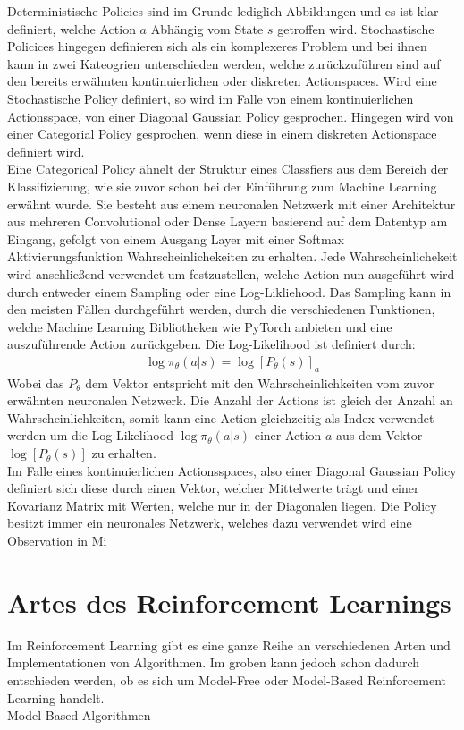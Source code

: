 \documentclass[]{iat}
\begin{document}
Deterministische Policies sind im Grunde lediglich Abbildungen und es ist klar definiert, welche Action $a$ Abhängig vom State $s$ getroffen wird. Stochastische Policices hingegen definieren sich als ein komplexeres Problem und bei ihnen kann in zwei Kateogrien unterschieden werden, welche zurückzuführen sind auf den bereits erwähnten kontinuierlichen oder diskreten Actionspaces. Wird eine Stochastische Policy definiert, so wird im Falle von einem kontinuierlichen Actionsspace, von einer Diagonal Gaussian Policy gesprochen. Hingegen wird von einer Categorial Policy gesprochen, wenn diese in einem diskreten Actionspace definiert wird.\\
Eine Categorical Policy ähnelt der Struktur eines Classfiers aus dem Bereich der Klassifizierung, wie sie zuvor schon bei der Einführung zum Machine Learning erwähnt wurde. Sie besteht aus einem neuronalen Netzwerk mit einer Architektur aus mehreren Convolutional oder Dense Layern basierend auf dem Datentyp am Eingang, gefolgt von einem Ausgang Layer mit einer Softmax Aktivierungsfunktion Wahrscheinlichekeiten zu erhalten. Jede Wahrscheinlichekeit wird anschließend verwendet um festzustellen, welche Action nun ausgeführt wird durch entweder einem Sampling oder eine Log-Likliehood. Das Sampling kann in den meisten Fällen durchgeführt werden, durch die verschiedenen Funktionen, welche Machine Learning Bibliotheken wie PyTorch anbieten und eine auszuführende Action zurückgeben. Die Log-Likelihood ist definiert durch:
\begin{align}
    \log \pi_\theta (a|s) = \log\left[P_\theta(s)\right]_a
\end{align}
Wobei das $P_\theta$ dem Vektor entspricht mit den Wahrscheinlichkeiten vom zuvor erwähnten neuronalen Netzwerk. Die Anzahl der Actions ist gleich der Anzahl an Wahrscheinlichkeiten, somit kann eine Action gleichzeitig als Index verwendet werden um die Log-Likelihood $\log \pi_\theta (a|s)$ einer Action $a$ aus dem Vektor $\log\left[P_\theta(s)\right]$ zu erhalten.\\
Im Falle eines kontinuierlichen Actionsspaces, also einer Diagonal Gaussian Policy definiert sich diese durch einen Vektor, welcher Mittelwerte trägt und einer Kovarianz Matrix mit Werten, welche nur in der Diagonalen liegen. Die Policy besitzt immer ein neuronales Netzwerk, welches dazu verwendet wird eine Observation in Mi

\section{Artes des Reinforcement Learnings} \label{sec:arten_rf}
Im Reinforcement Learning gibt es eine ganze Reihe an verschiedenen Arten und Implementationen von Algorithmen. Im groben kann jedoch schon dadurch entschieden werden, ob es sich um Model-Free oder Model-Based Reinforcement Learning handelt.\\
Model-Based Algorithmen
\end{document}

